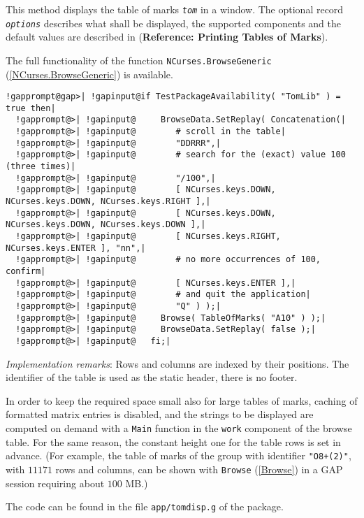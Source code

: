 \documentclass[a4paper,11pt]{report}
\begin{document}
{{{ This method displays the table of marks \mbox{\texttt{\mdseries\slshape tom}} in a window. The optional record \mbox{\texttt{\mdseries\slshape options}} describes what shall be displayed, the supported components and the default
values are described in{\nobreakspace} (\textbf{Reference: Printing Tables of Marks}). 

 The full functionality of the function \texttt{NCurses.BrowseGeneric} (\ref{NCurses.BrowseGeneric}) is available. 

 
\begin{Verbatim}[commandchars=!@|,fontsize=\small,frame=single,label=Example]
  !gapprompt@gap>| !gapinput@if TestPackageAvailability( "TomLib" ) = true then|
  !gapprompt@>| !gapinput@     BrowseData.SetReplay( Concatenation(|
  !gapprompt@>| !gapinput@        # scroll in the table|
  !gapprompt@>| !gapinput@        "DDRRR",|
  !gapprompt@>| !gapinput@        # search for the (exact) value 100 (three times)|
  !gapprompt@>| !gapinput@        "/100",|
  !gapprompt@>| !gapinput@        [ NCurses.keys.DOWN, NCurses.keys.DOWN, NCurses.keys.RIGHT ],|
  !gapprompt@>| !gapinput@        [ NCurses.keys.DOWN, NCurses.keys.DOWN, NCurses.keys.DOWN ],|
  !gapprompt@>| !gapinput@        [ NCurses.keys.RIGHT, NCurses.keys.ENTER ], "nn",|
  !gapprompt@>| !gapinput@        # no more occurrences of 100, confirm|
  !gapprompt@>| !gapinput@        [ NCurses.keys.ENTER ],|
  !gapprompt@>| !gapinput@        # and quit the application|
  !gapprompt@>| !gapinput@        "Q" ) );|
  !gapprompt@>| !gapinput@     Browse( TableOfMarks( "A10" ) );|
  !gapprompt@>| !gapinput@     BrowseData.SetReplay( false );|
  !gapprompt@>| !gapinput@   fi;|
\end{Verbatim}
 

 \emph{Implementation remarks}: Rows and columns are indexed by their positions. The identifier of the table
is used as the static header, there is no footer. 

 In order to keep the required space small also for large tables of marks,
caching of formatted matrix entries is disabled, and the strings to be
displayed are computed on demand with a \texttt{Main} function in the \texttt{work} component of the browse table. For the same reason, the constant height one
for the table rows is set in advance. (For example, the table of marks of the
group with identifier \texttt{"O8+(2)"}, with $11171$ rows and columns, can be shown with \texttt{Browse} (\ref{Browse}) in a \textsf{GAP} session requiring about $100$ MB.) 

 The code can be found in the file \texttt{app/tomdisp.g} of the package. }

}}
\end{document}
